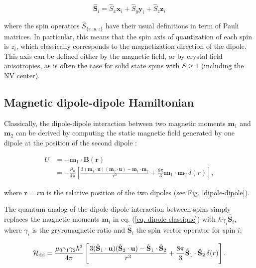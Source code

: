 \documentclass[a4paper,11pt]{report}
\begin{document}
\begin{refsection}
\begin{equation}
\hat{\mathbf{S}}_i=\hat{S}_x \mathbf{x}_i + \hat{S}_y \mathbf{y}_i + \hat{S}_z \mathbf{z}_i
\end{equation}

where the spin operators $\hat S_{\{x,y,z\} }$ have their usual definitions in term of Pauli matrices. In particular, this means that the spin axis of quantization of each spin is $z_i$, which classically corresponds to the magnetization direction of the dipole. This axis can be defined either by the magnetic field, or by crystal field anisotropies, as is often the case for solid state spins with $S\geq 1$ (including the NV center).

\subsection{Magnetic dipole-dipole Hamiltonian}

Classically, the dipole-dipole interaction between two magnetic moments $\mathbf{m}_1$ and $\mathbf{m}_2$ can be derived by computing the static magnetic field generated by one dipole at the position of the second dipole \cite[p.~188]{jackson1999classical}:

\begin{align}
U&=-\mathbf{m}_1 \cdot \mathbf{B}(\mathbf{r}) \nonumber \\
&=-\frac{\mu_0}{4 \pi}\left[ \frac{3 (\mathbf{m}_1\cdot\mathbf{u})(\mathbf{m}_2\cdot\mathbf{u}) - \mathbf{m}_1\cdot\mathbf{m}_2}{r^3}+\frac{8\pi}{3}\mathbf{m}_1\cdot\mathbf{m}_2\,\delta(r)\right], \label{eq. dipole classique}
\end{align}

where $\mathbf{r}=r \mathbf{u}$ is the relative position of the two dipoles (see Fig. \ref{dipole-dipole}). 

The quantum analog of the dipole-dipole interaction between spins simply replaces the magnetic moments $\mathbf{m}_i$ in eq. (\ref{eq. dipole classique}) with $\hbar \gamma_i \hat{\mathbf{S}}_i$, where $\gamma_i$ is the gryromagnetic ratio and $\hat{\mathbf{S}}_i$ the spin vector operator for spin $i$:

\begin{equation}
\mathcal{H}_{\rm dd}=\frac{\mu_0 \gamma_1 \gamma_2 \hbar^2}{4 \pi}\left[ \frac{3 (\hat{\mathbf{S}}_1\cdot\mathbf{u})(\hat{\mathbf{S}}_2\cdot\mathbf{u}) - \hat{\mathbf{S}}_1\cdot\hat{\mathbf{S}}_2}{r^3}+\frac{8\pi}{3}\hat{\mathbf{S}}_1\cdot\hat{\mathbf{S}}_2\,\delta(r)\right].
\end{equation}


\end{refsection}
\end{document}

